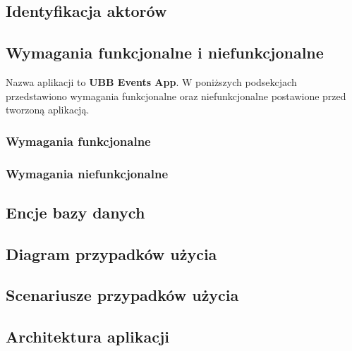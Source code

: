 \subsection{Identyfikacja aktorów}

\subsection{Wymagania funkcjonalne i niefunkcjonalne}
Nazwa aplikacji to \textbf{UBB Events App}. W poniższych podsekcjach przedstawiono wymagania funkcjonalne oraz niefunkcjonalne postawione przed tworzoną aplikacją.
\subsubsection{Wymagania funkcjonalne}

\subsubsection{Wymagania niefunkcjonalne}

\subsection{Encje bazy danych}

\subsection{Diagram przypadków użycia}

\subsection{Scenariusze przypadków użycia}
\subsection{Architektura aplikacji}
